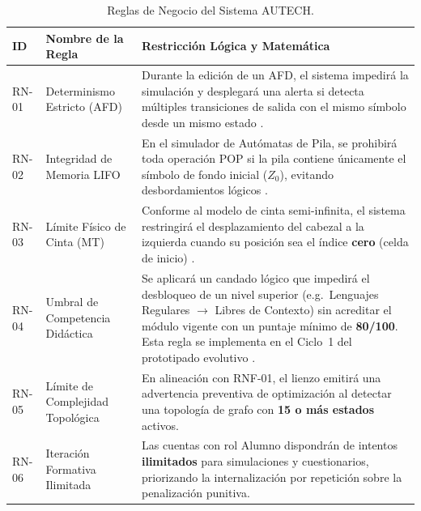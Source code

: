 \begin{table}[htbp]
\centering
\caption{Reglas de Negocio del Sistema AUTECH.}
\label{tab:reglas_negocio}
\setlength{\tabcolsep}{4pt}
\renewcommand{\arraystretch}{1.1}
\scriptsize
\begin{tabularx}{\textwidth}{@{} l >{\raggedright\arraybackslash}p{2.6cm} >{\raggedright\arraybackslash}X @{}}
\toprule
\textbf{ID} & \textbf{Nombre de la Regla} & \textbf{Restricción Lógica y Matemática} \\
\midrule

RN-01 & Determinismo Estricto (AFD) &
Durante la edición de un AFD, el sistema impedirá la simulación y desplegará una alerta si detecta múltiples transiciones de salida con el mismo símbolo desde un mismo estado \cite{hopcroft2007}. \\

RN-02 & Integridad de Memoria LIFO &
En el simulador de Autómatas de Pila, se prohibirá toda operación POP si la pila contiene únicamente el símbolo de fondo inicial ($Z_0$), evitando desbordamientos lógicos \cite{hopcroft2007}. \\

RN-03 & Límite Físico de Cinta (MT) &
Conforme al modelo de cinta semi-infinita, el sistema restringirá el desplazamiento del cabezal a la izquierda cuando su posición sea el índice \textbf{cero} (celda de inicio) \cite{hopcroft2007}. \\

RN-04 & Umbral de Competencia Didáctica &
Se aplicará un candado lógico que impedirá el desbloqueo de un nivel superior (e.g.\ Lenguajes Regulares $\to$ Libres de Contexto) sin acreditar el módulo vigente con un puntaje mínimo de \textbf{80/100}. Esta regla se implementa en el Ciclo~1 del prototipado evolutivo \cite{ipn2020}. \\

RN-05 & Límite de Complejidad Topológica &
En alineación con RNF-01, el lienzo emitirá una advertencia preventiva de optimización al detectar una topología de grafo con \textbf{15 o más estados} activos. \\

RN-06 & Iteración Formativa Ilimitada &
Las cuentas con rol Alumno dispondrán de intentos \textbf{ilimitados} para simulaciones y cuestionarios, priorizando la internalización por repetición sobre la penalización punitiva. \\

\bottomrule
\end{tabularx}
\end{table}

